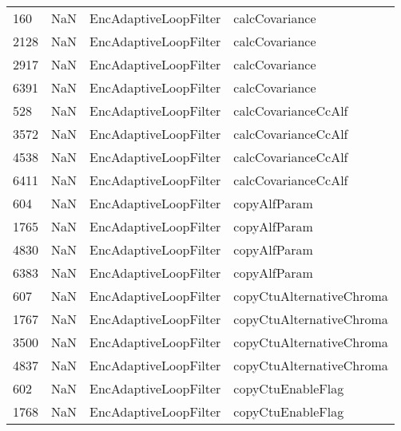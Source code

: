\begin{tabular}{llll}
160  &                   NaN &      EncAdaptiveLoopFilter &                            calcCovariance \\
2128 &                   NaN &      EncAdaptiveLoopFilter &                            calcCovariance \\
2917 &                   NaN &      EncAdaptiveLoopFilter &                            calcCovariance \\
6391 &                   NaN &      EncAdaptiveLoopFilter &                            calcCovariance \\
528  &                   NaN &      EncAdaptiveLoopFilter &                       calcCovarianceCcAlf \\
3572 &                   NaN &      EncAdaptiveLoopFilter &                       calcCovarianceCcAlf \\
4538 &                   NaN &      EncAdaptiveLoopFilter &                       calcCovarianceCcAlf \\
6411 &                   NaN &      EncAdaptiveLoopFilter &                       calcCovarianceCcAlf \\
604  &                   NaN &      EncAdaptiveLoopFilter &                              copyAlfParam \\
1765 &                   NaN &      EncAdaptiveLoopFilter &                              copyAlfParam \\
4830 &                   NaN &      EncAdaptiveLoopFilter &                              copyAlfParam \\
6383 &                   NaN &      EncAdaptiveLoopFilter &                              copyAlfParam \\
607  &                   NaN &      EncAdaptiveLoopFilter &                  copyCtuAlternativeChroma \\
1767 &                   NaN &      EncAdaptiveLoopFilter &                  copyCtuAlternativeChroma \\
3500 &                   NaN &      EncAdaptiveLoopFilter &                  copyCtuAlternativeChroma \\
4837 &                   NaN &      EncAdaptiveLoopFilter &                  copyCtuAlternativeChroma \\
602  &                   NaN &      EncAdaptiveLoopFilter &                         copyCtuEnableFlag \\
1768 &                   NaN &      EncAdaptiveLoopFilter &                         copyCtuEnableFlag \\

\end{tabular}
